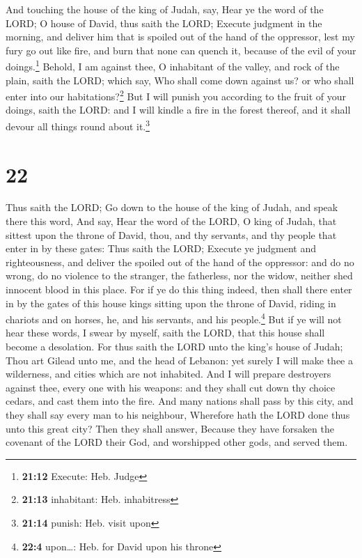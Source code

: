 And touching the house of the king of Judah, say, Hear
ye the word of the LORD;  O house of David, thus saith
the LORD; Execute judgment in the morning, and deliver him that is
spoiled out of the hand of the oppressor, lest my fury go out like fire,
and burn that none can quench it, because of the evil of your
doings.\footnote{\textbf{21:12} Execute: Heb. Judge} 
Behold, I am against thee, O inhabitant of the valley, and rock of the
plain, saith the LORD; which say, Who shall come down against us? or who
shall enter into our habitations?\footnote{\textbf{21:13} inhabitant:
  Heb. inhabitress}  But I will punish you according to
the fruit of your doings, saith the LORD: and I will kindle a fire in
the forest thereof, and it shall devour all things round about
it.\footnote{\textbf{21:14} punish: Heb. visit upon}

\hypertarget{section-21}{%
\section{22}\label{section-21}}

 Thus saith the LORD; Go down to the house of the king of
Judah, and speak there this word,  And say, Hear the word
of the LORD, O king of Judah, that sittest upon the throne of David,
thou, and thy servants, and thy people that enter in by these gates:
 Thus saith the LORD; Execute ye judgment and
righteousness, and deliver the spoiled out of the hand of the oppressor:
and do no wrong, do no violence to the stranger, the fatherless, nor the
widow, neither shed innocent blood in this place.  For if
ye do this thing indeed, then shall there enter in by the gates of this
house kings sitting upon the throne of David, riding in chariots and on
horses, he, and his servants, and his people.\footnote{\textbf{22:4}
  upon\ldots: Heb. for David upon his throne}  But if ye
will not hear these words, I swear by myself, saith the LORD, that this
house shall become a desolation.  For thus saith the LORD
unto the king's house of Judah; Thou art Gilead unto me, and the head of
Lebanon: yet surely I will make thee a wilderness, and cities which are
not inhabited.  And I will prepare destroyers against
thee, every one with his weapons: and they shall cut down thy choice
cedars, and cast them into the fire.  And many nations
shall pass by this city, and they shall say every man to his neighbour,
Wherefore hath the LORD done thus unto this great city? 
Then they shall answer, Because they have forsaken the covenant of the
LORD their God, and worshipped other gods, and served them.

